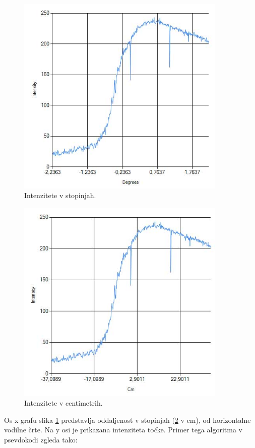 \documentclass[oneside, a4paper, 12pt]{book}
\begin{document}
\begin{figure}
\begin{center}
\includegraphics[width=10cm]{slike/intenzitete.jpg}
\end{center}
\caption{Intenzitete v stopinjah.}
\label{pic:intenzitete1}
\end{figure}

\begin{figure}
\begin{center}
\includegraphics[width=10cm]{slike/intenzitete-v-cm.jpg}
\end{center}
\caption{Intenzitete v centimetrih.}
\label{pic:intenzitete2}
\end{figure}

Os x grafu slika \ref{pic:intenzitete1} predstavlja oddaljenost v stopinjah (\ref{pic:intenzitete2} v cm), od horizontalne vodilne črte. Na y osi je prikazana intenziteta točke. Primer tega algoritma v psevdokodi zgleda tako:
\end{document}
